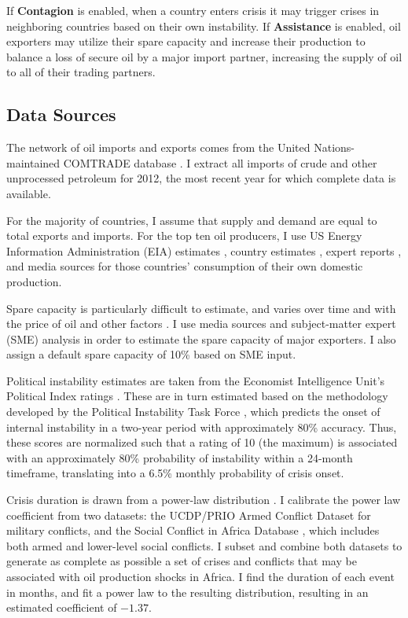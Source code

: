 \documentclass{llncs}
\begin{document}
If \textbf{Contagion} is enabled, when a country enters crisis it may trigger crises in neighboring countries based on their own instability. If \textbf{Assistance} is enabled, oil exporters may utilize their spare capacity and increase their production to balance a loss of secure oil by a major import partner, increasing the supply of oil to all of their trading partners.

\subsection{Data Sources}
The network of oil imports and exports comes from the United Nations-maintained COMTRADE database \cite{un_2013}. I extract all imports of crude and other unprocessed petroleum for 2012, the most recent year for which complete data is available.

For the majority of countries, I assume that supply and demand are equal to total exports and imports. For the top ten oil producers, I use US Energy Information Administration (EIA) estimates \cite{eia_2013}, country estimates \cite{canada_2009,eia_domestic}, expert reports \cite{mohamedi_2010}, and media sources \cite{rasmi_2013} for those countries' consumption of their own domestic production. 

Spare capacity is particularly difficult to estimate, and varies over time and with the price of oil and other factors \cite{mearns_2012}. I use media sources \cite{daya_2012} and subject-matter expert (SME) analysis \cite{mearns_2012} in order to estimate the spare capacity of major exporters. I also assign a default spare capacity of 10\% based on SME input.

Political instability estimates are taken from the Economist Intelligence Unit's Political Index ratings \cite{eiu_2013}. These are in turn estimated based on the methodology developed by the Political Instability Task Force \cite{goldstone_2005}, which predicts the onset of internal instability in a two-year period with approximately 80\% accuracy. Thus, these scores are normalized such that a rating of 10 (the maximum) is associated with an approximately 80\% probability of instability within a 24-month timeframe, translating into a 6.5\% monthly probability of crisis onset.

Crisis duration is drawn from a power-law distribution \cite{cioffi_2004}. I calibrate the power law coefficient from two datasets: the UCDP/PRIO Armed Conflict Dataset \cite{lotta_2013} for military conflicts, and the Social Conflict in Africa Database \cite{hendrix_2013}, which includes both armed and lower-level social conflicts. I subset and combine both datasets to generate as complete as possible a set of crises and conflicts that may be associated with oil production shocks in Africa. I find the duration of each event in months, and fit a power law to the resulting distribution, resulting in an estimated coefficient of $\mathbf{-1.37}$.
\end{document}
